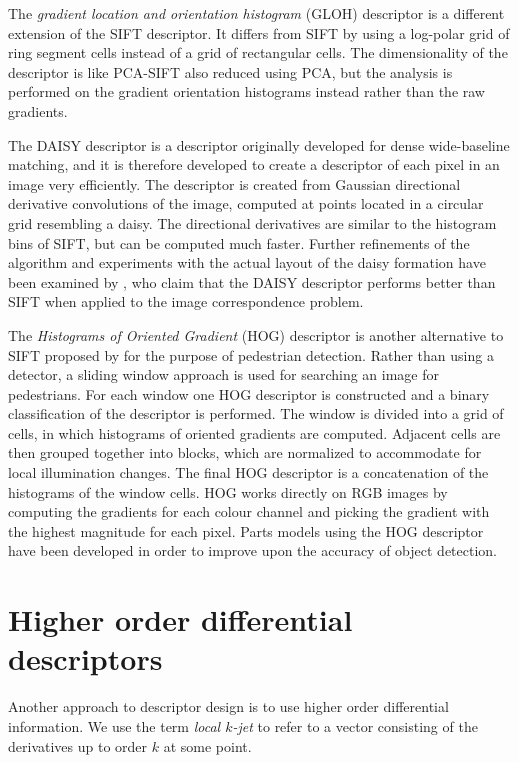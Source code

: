 \documentclass[thesis.tex]{subfiles}
\begin{document}
The \emph{gradient location and orientation histogram} (GLOH) descriptor \cite{mikolajczyk2005performance} is a different extension of the SIFT descriptor. It differs from SIFT by using a log-polar grid of ring segment cells instead of a grid of rectangular cells. The dimensionality of the descriptor is like PCA-SIFT also reduced using PCA, but the analysis is performed on the gradient orientation histograms instead rather than the raw gradients.

The DAISY descriptor \cite{tola2008fast} is a descriptor originally developed for dense wide-baseline matching, and it is therefore developed to create a descriptor of each pixel in an image very efficiently. The descriptor is created from Gaussian directional derivative convolutions of the image, computed at points located in a circular grid resembling a daisy. The directional derivatives are similar to the histogram bins of SIFT, but can be computed much faster. Further refinements of the algorithm and experiments with the actual layout of the daisy formation have been examined by \citet{winder2009picking}, who claim that the DAISY descriptor performs better than SIFT when applied to the image correspondence problem.

The \emph{Histograms of Oriented Gradient} (HOG) descriptor is another alternative to SIFT proposed by \citet{dalal2005histograms} for the purpose of pedestrian detection. Rather than using a detector, a sliding window approach is used for searching an image for pedestrians. For each window one HOG descriptor is constructed and a binary classification of the descriptor is performed. The window is divided into a grid of cells, in which histograms of oriented gradients are computed. Adjacent cells are then grouped together into blocks, which are normalized to accommodate for local illumination changes. The final HOG descriptor is a concatenation of the histograms of the window cells. HOG works directly on RGB images by computing the gradients for each colour channel and picking the gradient with the highest magnitude for each pixel. Parts models using the HOG descriptor have been developed \cite{felzenszwalb2008discriminatively} in order to improve upon the accuracy of object detection.

\section{Higher order differential descriptors}

Another approach to descriptor design is to use higher order differential information. We use the term \emph{local $k$-jet} to refer to a vector consisting of the derivatives up to order $k$ at some point.
\end{document}
